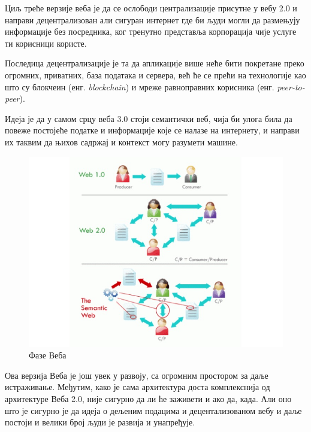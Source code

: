 \documentclass[12pt,oneside]{memoir}
\begin{document}
Циљ треће верзије веба је да се ослободи централизације присутне у вебу 2.0 и направи децентрализован али сигуран интернет где би људи могли да размењују информације без посредника, ког тренутно представља корпорација чије услуге ти корисници користе.

Последица децентрализације је та да апликације више неће бити покретане преко огромних, приватних, база података и сервера, већ ће се прећи на технологије као што су блокчеин (енг. \textit{blockchain}) и мреже равноправних корисника (енг. \textit{peer-to-peer}).

Идеја је да у самом срцу веба 3.0 стоји семантички веб, чија би улога била да повеже постојеће податке и информације које се налазе на интернету, и направи их таквим да њихов садржај и контекст могу разумети машине.

\begin{figure}[!ht]
  \centering
  \includegraphics[width=1\textwidth]{pictures/webs_vrs.jpg}
  \caption{Фазе Веба}
  \label{fig:sem_veb_versions}
\end{figure}

Ова верзија Веба је још увек у развоју, са огромним простором за даље истраживање. Међутим, како је сама архитектура доста комплекснија од архитектуре Веба 2.0, није сигурно да ли ће заживети и ако да, када. Али оно што је сигурно је да идеја о дељеним подацима и децентализованом вебу и даље постоји и велики број људи је развија и унапређује.

\end{document}
